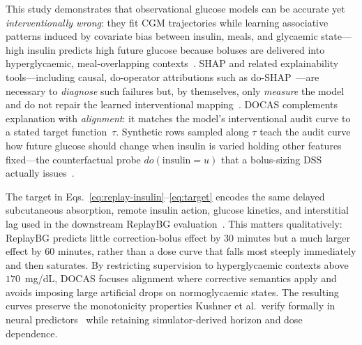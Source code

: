 \documentclass[a4paper,fleqn]{cas-sc}
\begin{document}
This study demonstrates that observational glucose models can be
accurate yet \emph{interventionally wrong}: they fit CGM trajectories while
learning associative patterns induced by covariate bias between insulin, meals,
and glycaemic state---high insulin predicts high future glucose because boluses
are delivered into hyperglycaemic, meal-overlapping
contexts~\citep{prendin2023,kushner2020}. SHAP and related
explainability tools---including causal, do-operator attributions such as
do-SHAP~\citep{janzing2020causal,jung2022doshapley}---are necessary to
\emph{diagnose} such failures but, by themselves, only \emph{measure} the model
and do not repair the learned interventional
mapping~\citep{lundberg2017,miller2019}. DOCAS complements explanation with
\emph{alignment}: it matches the model's interventional audit curve to a stated
target function~$\tau$. Synthetic rows sampled along $\tau$ teach the audit
curve how future glucose should change when insulin is varied holding other
features fixed---the counterfactual probe $do(\mathrm{insulin}=u)$ that a
bolus-sizing DSS actually issues~\citep{pearl2009causality,prendin2023,cappon2023}.

The target in Eqs.~\eqref{eq:replay-insulin}--\eqref{eq:target}
encodes the same delayed subcutaneous absorption, remote insulin action,
glucose kinetics, and interstitial lag used in the downstream ReplayBG
evaluation~\citep{cappon2023}. This matters qualitatively: ReplayBG predicts
little correction-bolus effect by 30 minutes but a much larger effect by
60 minutes, rather than a dose curve that falls most steeply immediately and
then saturates. By restricting supervision to
hyperglycaemic contexts above $170$~mg/dL, DOCAS focuses alignment where
corrective semantics apply and avoids imposing large artificial drops on
normoglycaemic states. The resulting curves preserve the monotonicity
properties Kushner et al.\ verify formally in neural
predictors~\citep{kushner2020} while retaining simulator-derived
horizon and dose dependence.
\end{document}
